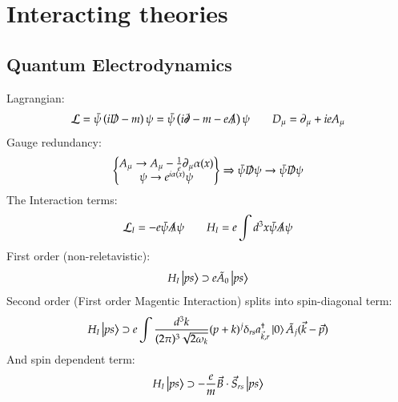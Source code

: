 \documentclass{article}
\begin{document}
\section{Interacting theories}
\subsection{Quantum Electrodynamics}
Lagrangian:
\begin{equation*}
    \mathcal{L} = \bar{\psi}\left(i\slashed{D} - m\right)\psi = \bar{\psi}\left(i\slashed{\partial} - m  - e\slashed{A}\right)\psi
    \qquad
    D_\mu = \partial_\mu +ieA_\mu
\end{equation*}
Gauge redundancy:
\begin{equation*}
    \left\{\begin{matrix}
        A_\mu \rightarrow A_\mu - \frac{1}{e}\partial_\mu \alpha(x)
    \\
    \psi \rightarrow e^{i\alpha(x)}\psi
    \end{matrix}\right\} \Rightarrow \bar{\psi}\slashed{D}\psi \rightarrow \bar{\psi}\slashed{D}\psi
\end{equation*}
The Interaction terms:
\begin{equation*}
    \mathcal{L}_I = - e \bar{\psi}\slashed{A}\psi
    \qquad
    H_I = e\int d^3x \bar{\psi}\slashed{A}\psi
\end{equation*}
First order (non-reletavistic):
\begin{equation*}
    H_{I} \ket{ps}	\supset e \tilde{A}_0 \ket{ps}
\end{equation*}
Second order (First order Magentic Interaction) splits into spin-diagonal term:
\begin{equation*}
    H_I \ket{ps} \supset e \int \frac{d^3k}{(2\pi)^3 \sqrt{2\omega_k}}(p+k)^j\delta_{rs} a_{\vec{k}, r}^\dagger \ket{0}\tilde{A}_j(\vec{k} - \vec{p})
\end{equation*}
And spin dependent term:
\begin{equation*}
    H_I \ket{ps} \supset -\frac{e}{m}\vec{B}\cdot\vec{S}_{rs} \ket{ps}
\end{equation*}
\end{document}
